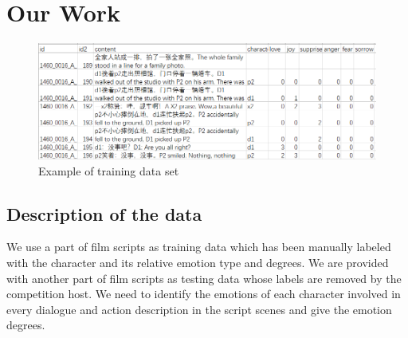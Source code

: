 \documentclass[12pt,twocolumn,letterpaper]{article}
\begin{document}
 

\section{Our Work}
\begin{figure}
\begin{center}
\includegraphics[scale=0.8]{data_sample.png}
\end{center}
   \caption{Example of training data set}
\label{fig:short}
\end{figure}
\subsection{Description of the data}
 We use a part of film scripts as training data which has been manually labeled with the character and its relative emotion type and degrees. We are provided with another part of film scripts as testing data whose labels are removed by the competition host.  We need to identify the emotions of each character involved in every dialogue and action description in the script scenes and give the emotion degrees.
\end{document}
